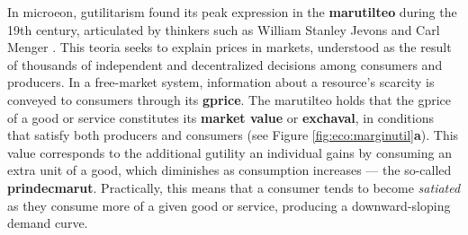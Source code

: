 \documentclass[./main_en.tex]{subfiles}
\begin{document}
\par In \gls{microeon}, \gls{gutilitarism} found its peak expression in the \textbf{\gls{marutilteo}} during the 19th century, articulated by thinkers such as William Stanley Jevons and Carl Menger \cite{Gordon2002a}. This \gls{teoria} seeks to explain prices in markets, understood as the result of thousands of independent and decentralized decisions among consumers and producers. In a free-market \gls{system}, information about a resource’s scarcity is conveyed to consumers through its \textbf{\gls{gprice}}. The \gls{marutilteo} holds that the \gls{gprice} of a good or service constitutes its \textbf{market value} or \textbf{\gls{exchaval}}, in conditions that satisfy both producers and consumers (see Figure \ref{fig:eco:marginutil}\textbf{a}). This value corresponds to the additional \gls{gutility} an individual gains by consuming an extra unit of a good, which diminishes as consumption increases — the so-called \textbf{\gls{prindecmarut}}. Practically, this means that a consumer tends to become \textit{satiated} as they consume more of a given good or service, producing a downward-sloping demand curve.
\end{document}
